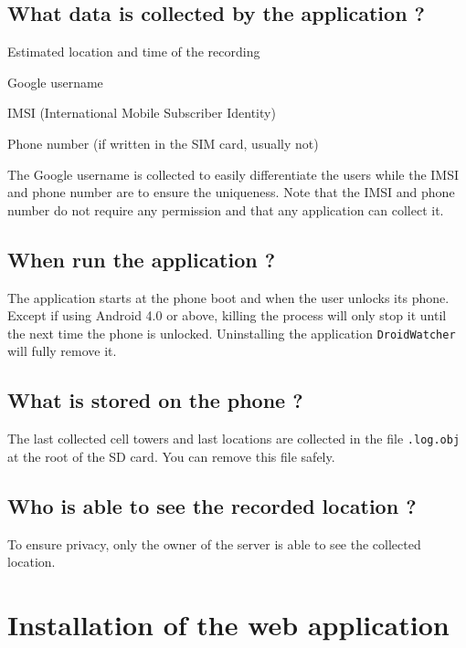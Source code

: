 \subsection{What data is collected by the application ?}

\begin{itemizealt}
\item Estimated location and time of the recording
\item Google username
\item IMSI (International Mobile Subscriber Identity)
\item Phone number (if written in the SIM card, usually not)
\end{itemizealt}

The Google username is collected to easily differentiate the users while the IMSI and phone number are to ensure the uniqueness.
Note that the IMSI and phone number do not require any permission and that any application can collect it.

\subsection{When run the application ?}

The application starts at the phone boot and when the user unlocks its phone.
Except if using Android 4.0 or above, killing the process will only stop it until the next time the phone is unlocked.
Uninstalling the application \texttt{DroidWatcher} will fully remove it.

\subsection{What is stored on the phone ?}

The last collected cell towers and last locations are collected in the file \texttt{.log.obj} at the root of the SD card. You can remove this file safely.

\subsection{Who is able to see the recorded location ?}

To ensure privacy, only the owner of the server is able to see the collected location.


\section{Installation of the web application}
\label{sec:dw-django}

